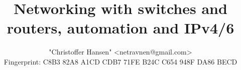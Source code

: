 \documentclass[a4paper,12pt,twoside,twocolumn,landscape]{book}
\title{Networking with switches and routers, automation and IPv4/6}
\author{"Christoffer Hansen" <netravnen@gmail.com>\\
    Fingerprint: C8B3 82A8 A1CD CDB7 71FE  B24C C654 948F DA86 BECD}
\begin{document}

\tableofcontents

\setlength{\parskip}{0.35em} %
\renewcommand{\baselinestretch}{1.15} %
















\clearpage
\printglossary[type=\acronymtype,title=Special Terms,toctitle=List of terms]


\renewcommand{\listfigurename}{List of {\footnotesize hidden} Figures}
\listoffigures


\renewcommand{\listtablename}{Tables {\footnotesize hidding} on the pages}
\listoftables




\end{document}
